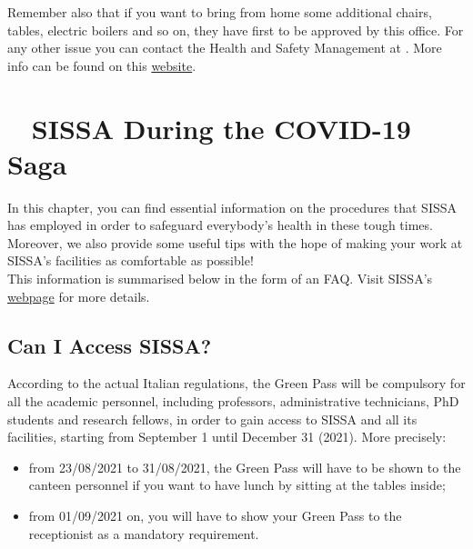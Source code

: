 \documentclass{sissavademecum}
\begin{document}
Remember also that if you want to bring from home some additional chairs, tables, electric boilers and so on, they have first to be approved by this office. For any other issue you can contact the Health and Safety Management at . More info can be found on this \href{http://www.sissa.it/safety}{website}.




\chapter{\texorpdfstring{\faShieldVirus\ }{} SISSA During the COVID-19 Saga}

In this chapter, you can find essential information on the procedures that SISSA has employed in order to safeguard everybody's health in these tough times. Moreover, we also provide some useful tips with the hope of making your work at SISSA's facilities as comfortable as possible! \\
This information is summarised below in the form of an FAQ. Visit SISSA's \href{https://www.sissa.it/news/covid-19-access-sissa-and-schools-activities}{webpage} for more details.


\section{Can I Access SISSA?}

According to the actual Italian regulations, the Green Pass will be compulsory for all the academic personnel, including professors, administrative technicians, PhD students and research fellows, in order to gain access to SISSA and all its facilities, starting from September 1 until December 31 (2021). More precisely:
\begin{itemize}
    \item from 23/08/2021 to 31/08/2021, the Green Pass will have to be shown to the canteen personnel if you want to have lunch by sitting at the tables inside;
    \item from 01/09/2021 on, you will have to show your Green Pass to the receptionist as a mandatory requirement.
\end{itemize}
\end{document}
